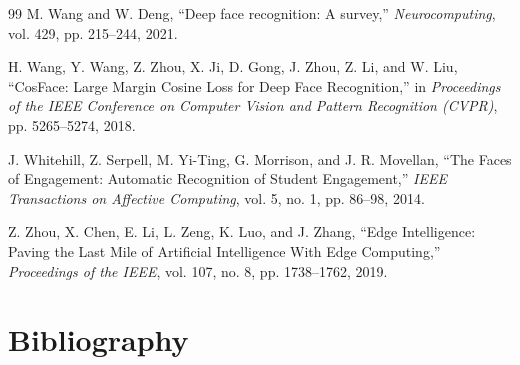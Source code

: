\documentclass[12pt,a4paper,oneside]{report}
\begin{document}
\begin{thebibliography}{99}
M. Wang and W. Deng, ``Deep face recognition: A survey,'' \textit{Neurocomputing}, vol. 429, pp. 215--244, 2021.

H. Wang, Y. Wang, Z. Zhou, X. Ji, D. Gong, J. Zhou, Z. Li, and W. Liu, ``CosFace: Large Margin Cosine Loss for Deep Face Recognition,'' in \textit{Proceedings of the IEEE Conference on Computer Vision and Pattern Recognition (CVPR)}, pp. 5265--5274, 2018.

J. Whitehill, Z. Serpell, M. Yi-Ting, G. Morrison, and J. R. Movellan, ``The Faces of Engagement: Automatic Recognition of Student Engagement,'' \textit{IEEE Transactions on Affective Computing}, vol. 5, no. 1, pp. 86--98, 2014.

Z. Zhou, X. Chen, E. Li, L. Zeng, K. Luo, and J. Zhang, ``Edge Intelligence: Paving the Last Mile of Artificial Intelligence With Edge Computing,'' \textit{Proceedings of the IEEE}, vol. 107, no. 8, pp. 1738--1762, 2019.

\end{thebibliography}
\endgroup

\chapter{Bibliography}
\thispagestyle{empty}
\end{document}
